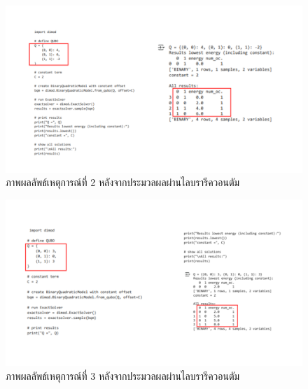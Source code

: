     \begin{figure}
      \begin{center}
      \includegraphics[width=5.5in]{case2_RunPicture.png}
      \end{center}
      \caption[Poem]{ภาพผลลัพธ์เหตุการณ์ที่ 2 หลังจากประมวลผลผ่านไลบรารีควอนตัม }
      \end{figure}
      \begin{figure}
        \begin{center}
        \includegraphics[width=5.5in]{case3_RunPicture.png}
        \end{center}
        \caption[Poem]{ภาพผลลัพธ์เหตุการณ์ที่ 3 หลังจากประมวลผลผ่านไลบรารีควอนตัม }
        \end{figure}


